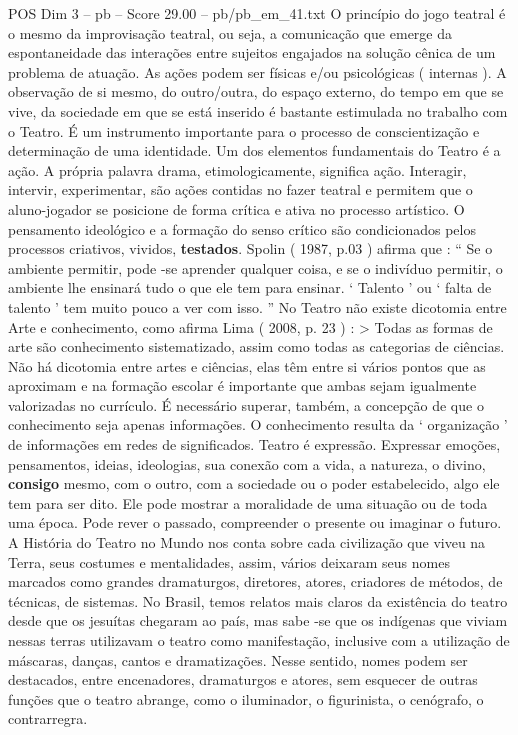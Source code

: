 \begin{textsample}{POS Dim 3 – pb – Score 29.00 – pb/pb\_em\_41.txt}
O princípio do jogo teatral é o mesmo da improvisação teatral, ou seja, a comunicação que emerge da espontaneidade das interações entre sujeitos engajados na solução cênica de um problema de atuação.
As ações podem ser físicas e/ou psicológicas ( internas ).
A observação de si mesmo, do outro/outra, do espaço externo, do tempo em que se vive, da sociedade em que se está inserido é bastante estimulada no trabalho com o Teatro.
É um instrumento importante para o processo de conscientização e determinação de uma identidade.
Um dos elementos fundamentais do Teatro é a ação.
A própria palavra drama, etimologicamente, significa ação.
Interagir, intervir, experimentar, são ações contidas no fazer teatral e permitem que o aluno-jogador se posicione de forma crítica e ativa no processo artístico.
O pensamento ideológico e a formação do senso crítico são condicionados pelos processos criativos, vividos, \textbf{testados}.
Spolin ( 1987, p.03 ) afirma que : “ Se o ambiente permitir, pode -se aprender qualquer coisa, e se o indivíduo permitir, o ambiente lhe ensinará tudo o que ele tem para ensinar. ‘ Talento ’ ou ‘ falta de talento ’ tem muito pouco a ver com isso. ” No Teatro não existe dicotomia entre Arte e conhecimento, como afirma Lima ( 2008, p. 23 ) : > Todas as formas de arte são conhecimento sistematizado, assim como todas as categorias de ciências.
Não há dicotomia entre artes e ciências, elas têm entre si vários pontos que as aproximam e na formação escolar é importante que ambas sejam igualmente valorizadas no currículo.
É necessário superar, também, a concepção de que o conhecimento seja apenas informações.
O conhecimento resulta da ‘ organização ’ de informações em redes de significados.
Teatro é expressão.
Expressar emoções, pensamentos, ideias, ideologias, sua conexão com a vida, a natureza, o divino, \textbf{consigo} mesmo, com o outro, com a sociedade ou o poder estabelecido, algo ele tem para ser dito.
Ele pode mostrar a moralidade de uma situação ou de toda uma época.
Pode rever o passado, compreender o presente ou imaginar o futuro.
A História do Teatro no Mundo nos conta sobre cada civilização que viveu na Terra, seus costumes e mentalidades, assim, vários deixaram seus nomes marcados como grandes dramaturgos, diretores, atores, criadores de métodos, de técnicas, de sistemas.
No Brasil, temos relatos mais claros da existência do teatro desde que os jesuítas chegaram ao país, mas sabe -se que os indígenas que viviam nessas terras utilizavam o teatro como manifestação, inclusive com a utilização de máscaras, danças, cantos e dramatizações.
Nesse sentido, nomes podem ser destacados, entre encenadores, dramaturgos e atores, sem esquecer de outras funções que o teatro abrange, como o iluminador, o figurinista, o cenógrafo, o contrarregra.

\end{textsample}
